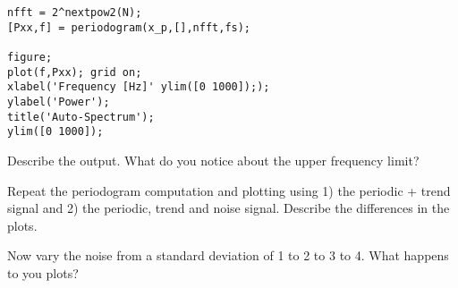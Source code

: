 \documentclass[10pt,fleqn]{article}
\begin{document}
\begin{lstlisting}
nfft = 2^nextpow2(N);
[Pxx,f] = periodogram(x_p,[],nfft,fs);

figure;
plot(f,Pxx); grid on;
xlabel('Frequency [Hz]' ylim([0 1000]););
ylabel('Power');
title('Auto-Spectrum');
ylim([0 1000]);
\end{lstlisting}

Describe the output. What do you notice about the upper frequency limit?

Repeat the periodogram computation and plotting using 1) the periodic + trend signal and 2) the periodic, trend and noise signal. Describe the differences in the plots.

Now vary the noise from a standard deviation of 1 to 2 to 3 to 4. What happens to you plots?
\end{document}
